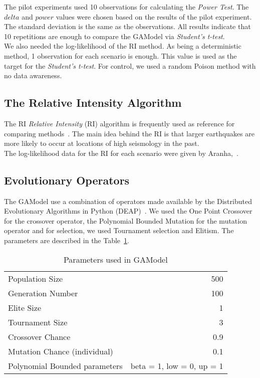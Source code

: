 The pilot experiments used 10 observations for calculating the {\it Power Test}. The $delta$ and $power$ values were chosen based on the results of the pilot experiment. The standard deviation is the same as the observations. All results indicate that 10 repetitions are enough to compare the GAModel via {\it Student's t-test}.\\

We also needed the log-likelihood of the RI method. As being a deterministic method, 1 observation for each scenario is enough. This value is used as the target for the {\it Student's t-test}. For control, we used a random Poison method with no data awareness.\\

\subsection{The Relative Intensity Algorithm}\label{ri}
The RI {\it Relative Intensity} (RI) algorithm is frequently used as reference for comparing methods~\cite{Nanjo2011}. The main idea behind the RI is that larger earthquakes are more likely to occur at locations of high seismology in the past.\\
	
The log-likelihood data for the RI for each scenario were given by Aranha,~\cite{ecta14}.\\



\subsection{Evolutionary Operators}

The GAModel use a combination of operators made available by the Distributed Evolutionary Algorithms in Python (DEAP)~\cite{DeRainville}. We used the One Point Crossover for the crossover operator, the Polynomial Bounded Mutation for the mutation operator and for selection, we used Tournament selection and Elitism. The parameters are described in the Table~\ref{GAParameters}.\\

\begin{table}[!ht]
	\caption{Parameters used in GAModel}
	\label{GAParameters}
	\begin{center}
		\begin{tabular}{|l|r|}
			\hline
			Population Size & 500\\
			Generation Number & 100\\
			Elite Size & 1\\
			Tournament Size & 3\\
			Crossover Chance & 0.9\\
			Mutation Chance (individual) & 0.1\\
			Polynomial Bounded parameters & beta = 1, low = 0, up = 1\\
			\hline    
		\end{tabular}
	\end{center}
\end{table}



